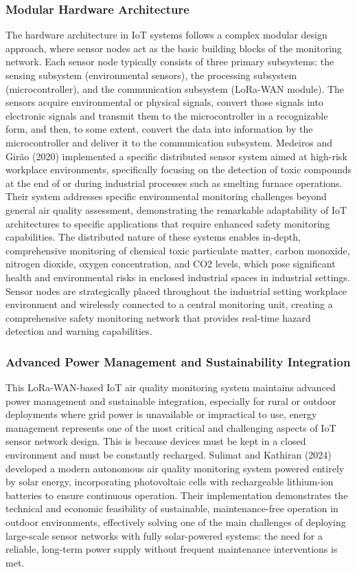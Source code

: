 \documentclass[conference]{IEEEtran}
\begin{document}
\subsubsection{Modular Hardware Architecture}
The hardware architecture in IoT systems follows a complex modular design approach, where sensor nodes act as the basic building blocks of the monitoring network. Each sensor node typically consists of three primary subsystems: the sensing subsystem (environmental sensors), the processing subsystem (microcontroller), and the communication subsystem (LoRa-WAN module). The sensors acquire environmental or physical signals, convert those signals into electronic signals and transmit them to the microcontroller in a recognizable form, and then, to some extent, convert the data into information by the microcontroller and deliver it to the communication subsystem. Medeiros and Girão (2020) implemented a specific distributed sensor system aimed at high-risk workplace environments, specifically focusing on the detection of toxic compounds at the end of or during industrial processes such as smelting furnace operations. Their system addresses specific environmental monitoring challenges beyond general air quality assessment, demonstrating the remarkable adaptability of IoT architectures to specific applications that require enhanced safety monitoring capabilities. The distributed nature of these systems enables in-depth, comprehensive monitoring of chemical toxic particulate matter, carbon monoxide, nitrogen dioxide, oxygen concentration, and CO2 levels, which pose significant health and environmental risks in enclosed industrial spaces in industrial settings. Sensor nodes are strategically placed throughout the industrial setting workplace environment and wirelessly connected to a central monitoring unit, creating a comprehensive safety monitoring network that provides real-time hazard detection and warning capabilities.~\cite{medeiros2020}

\subsubsection{Advanced Power Management and Sustainability Integration}
This LoRa-WAN-based IoT air quality monitoring system maintains advanced power management and sustainable integration, especially for rural or outdoor deployments where grid power is unavailable or impractical to use, energy management represents one of the most critical and challenging aspects of IoT sensor network design. This is because devices must be kept in a closed environment and must be constantly recharged. Sulimat and Kathiran (2024) developed a modern autonomous air quality monitoring system powered entirely by solar energy, incorporating photovoltaic cells with rechargeable lithium-ion batteries to ensure continuous operation. Their implementation demonstrates the technical and economic feasibility of sustainable, maintenance-free operation in outdoor environments, effectively solving one of the main challenges of deploying large-scale sensor networks with fully solar-powered systems: the need for a reliable, long-term power supply without frequent maintenance interventions is met.
\end{document}
